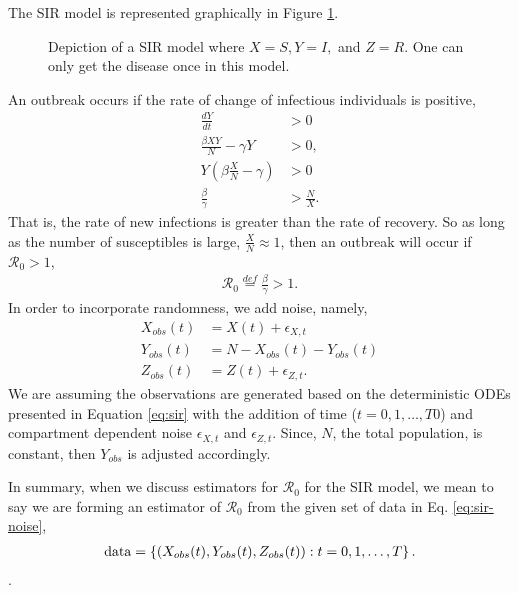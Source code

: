\documentclass[12pt]{article}
\newcommand{\rr}{\ensuremath{\mathcal{R}_0}}
\begin{document}
The SIR model is represented graphically in Figure \ref{fig::sir}. 
\begin{figure}[h]
\centering
{}
\caption{Depiction of a SIR model where $X=S, Y=I,$ and $Z=R$.  One can only get the disease once in this model.}\label{fig::sir}
\end{figure}
An outbreak occurs if the rate of change of infectious individuals is positive,
\begin{align*}
  \frac{dY}{dt} &> 0 \\
  \frac{\beta X Y}{N}  - \gamma Y &> 0 ,\\
  Y \left ( \beta \frac{X}{N} - \gamma \right ) & > 0\\
   \frac{\beta}{\gamma} &> \frac{N}{X}.
\end{align*}
That is,  the rate of new infections is greater than the rate of recovery.  So as long as the number of susceptibles is large, $\frac{X}{N} \approx 1$, then an outbreak will occur if $\rr >1$,
\begin{align*}
  \rr \overset{def}{=} \frac{\beta}{\gamma} > 1.
  \end{align*}
  In order to incorporate randomness, we add noise, namely,
  \begin{align}\label{eq:sir-noise}
    X_{obs}(t) &= X(t) + \epsilon_{X,t}\\
    Y_{obs}(t) &=  N - X_{obs}(t) -Y_{obs}(t)  \nonumber\\
    Z_{obs}(t) &= Z(t) + \epsilon_{Z,t}. \nonumber
  \end{align}
We are assuming the observations are generated based on the deterministic ODEs presented in Equation \ref{eq:sir} with the addition of time ($t=0, 1, \dots, T$0) and compartment dependent noise $\epsilon_{X,t}$ and $\epsilon_{Z,t}$.  Since, $N$, the total population, is constant, then $Y_{obs}$ is adjusted accordingly.

In summary, when we discuss estimators for $\rr$ for the SIR model, we mean to say we are forming an estimator of $\rr$ from the given set of data in Eq. \ref{eq:sir-noise},
\begin{align*}
\textnormal{data} = \left \{\left (X_{obs}(t), Y_{obs}(t), Z_{obs}(t) \right ) : t=0, 1, \dots, T\right \}.
  \end{align*}.
  
\end{document}
